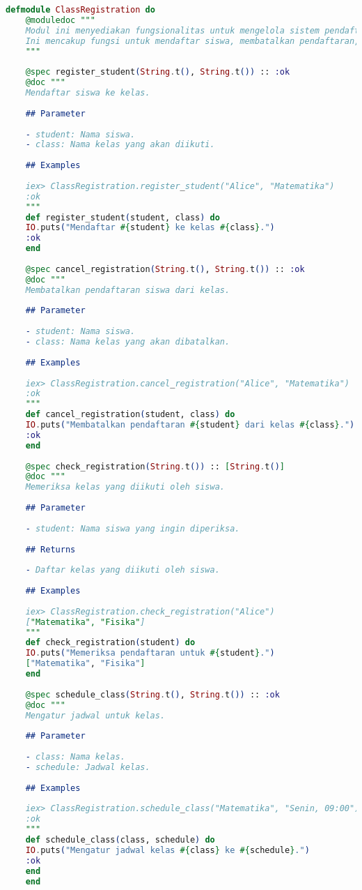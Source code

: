 \begin{lstlisting}[language=Elixir, caption={Modul Pendaftaran Kelas}]
	defmodule ClassRegistration do
	@moduledoc """
	Modul ini menyediakan fungsionalitas untuk mengelola sistem pendaftaran kelas.
	Ini mencakup fungsi untuk mendaftar siswa, membatalkan pendaftaran, memeriksa pendaftaran, dan mengatur jadwal kelas.
	"""
	
	@spec register_student(String.t(), String.t()) :: :ok
	@doc """
	Mendaftar siswa ke kelas.
	
	## Parameter
	
	- student: Nama siswa.
	- class: Nama kelas yang akan diikuti.
	
	## Examples
	
	iex> ClassRegistration.register_student("Alice", "Matematika")
	:ok
	"""
	def register_student(student, class) do
	IO.puts("Mendaftar #{student} ke kelas #{class}.")
	:ok
	end
	
	@spec cancel_registration(String.t(), String.t()) :: :ok
	@doc """
	Membatalkan pendaftaran siswa dari kelas.
	
	## Parameter
	
	- student: Nama siswa.
	- class: Nama kelas yang akan dibatalkan.
	
	## Examples
	
	iex> ClassRegistration.cancel_registration("Alice", "Matematika")
	:ok
	"""
	def cancel_registration(student, class) do
	IO.puts("Membatalkan pendaftaran #{student} dari kelas #{class}.")
	:ok
	end
	
	@spec check_registration(String.t()) :: [String.t()]
	@doc """
	Memeriksa kelas yang diikuti oleh siswa.
	
	## Parameter
	
	- student: Nama siswa yang ingin diperiksa.
	
	## Returns
	
	- Daftar kelas yang diikuti oleh siswa.
	
	## Examples
	
	iex> ClassRegistration.check_registration("Alice")
	["Matematika", "Fisika"]
	"""
	def check_registration(student) do
	IO.puts("Memeriksa pendaftaran untuk #{student}.")
	["Matematika", "Fisika"]
	end
	
	@spec schedule_class(String.t(), String.t()) :: :ok
	@doc """
	Mengatur jadwal untuk kelas.
	
	## Parameter
	
	- class: Nama kelas.
	- schedule: Jadwal kelas.
	
	## Examples
	
	iex> ClassRegistration.schedule_class("Matematika", "Senin, 09:00")
	:ok
	"""
	def schedule_class(class, schedule) do
	IO.puts("Mengatur jadwal kelas #{class} ke #{schedule}.")
	:ok
	end
	end
\end{lstlisting}


